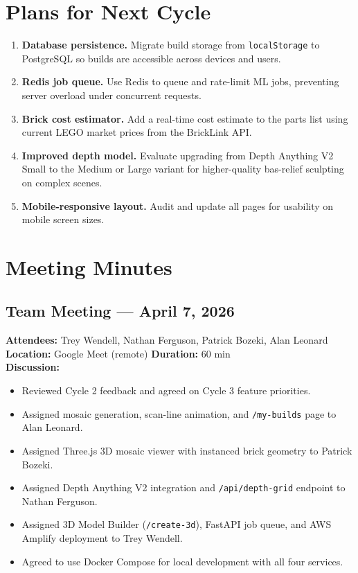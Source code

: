 \documentclass[12pt]{article}
\begin{document}
\section{Plans for Next Cycle}

\begin{enumerate}[leftmargin=*]
    \item \textbf{Database persistence.} Migrate build storage from
          \texttt{localStorage} to PostgreSQL so builds are accessible across
          devices and users.
    \item \textbf{Redis job queue.} Use Redis to queue and rate-limit ML jobs,
          preventing server overload under concurrent requests.
    \item \textbf{Brick cost estimator.} Add a real-time cost estimate to
          the parts list using current LEGO market prices from the BrickLink
          API.
    \item \textbf{Improved depth model.} Evaluate upgrading from Depth
          Anything V2 Small to the Medium or Large variant for higher-quality
          bas-relief sculpting on complex scenes.
    \item \textbf{Mobile-responsive layout.} Audit and update all pages for
          usability on mobile screen sizes.
\end{enumerate}

\newpage
\section{Meeting Minutes}

\subsection{Team Meeting --- April 7, 2026}

\textbf{Attendees:} Trey Wendell, Nathan Ferguson, Patrick Bozeki, Alan Leonard\\
\textbf{Location:} Google Meet (remote) \quad \textbf{Duration:} 60 min\\[0.5em]

\textbf{Discussion:}
\begin{itemize}[leftmargin=*]
    \item Reviewed Cycle 2 feedback and agreed on Cycle 3 feature priorities.
    \item Assigned mosaic generation, scan-line animation, and \texttt{/my-builds} page to Alan Leonard.
    \item Assigned Three.js 3D mosaic viewer with instanced brick geometry to Patrick Bozeki.
    \item Assigned Depth Anything V2 integration and \texttt{/api/depth-grid} endpoint to Nathan Ferguson.
    \item Assigned 3D Model Builder (\texttt{/create-3d}), FastAPI job queue, and AWS Amplify deployment to Trey Wendell.
    \item Agreed to use Docker Compose for local development with all four services.
\end{itemize}
\end{document}
